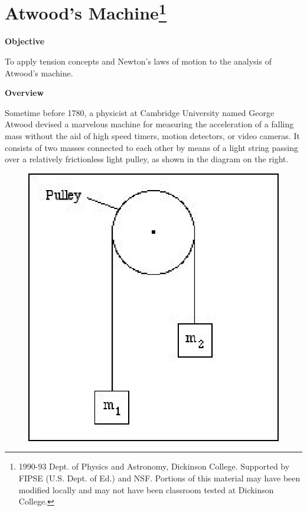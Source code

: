 
\section{Atwood's Machine\footnote{
1990-93 Dept. of Physics and Astronomy, Dickinson College. Supported by FIPSE
(U.S. Dept. of Ed.) and NSF. Portions of this material may have been modified
locally and may not have been classroom tested at Dickinson College.
}}

\makelabheader %

\textbf{Objective }

To apply tension concepts and Newton's laws of motion to the analysis of Atwood's
machine.

\textbf{Overview }

Sometime before 1780, a physicist at Cambridge University named George Atwood
devised a marvelous machine for measuring the acceleration of a falling mass
without the aid of high speed timers, motion detectors, or video cameras. It
consists of two masses connected to each other by means of a light string passing
over a relatively frictionless light pulley, as shown in the diagram on the right.


\begin{figure}
\vspace{-0.8cm}
\begin{center}
    \includegraphics[scale = 0.85,trim={0.5cm, 0.5cm, 2.0cm, 0.5cm},clip]{atwood/atwood_fig1.eps}
\end{center}
\end{figure}

